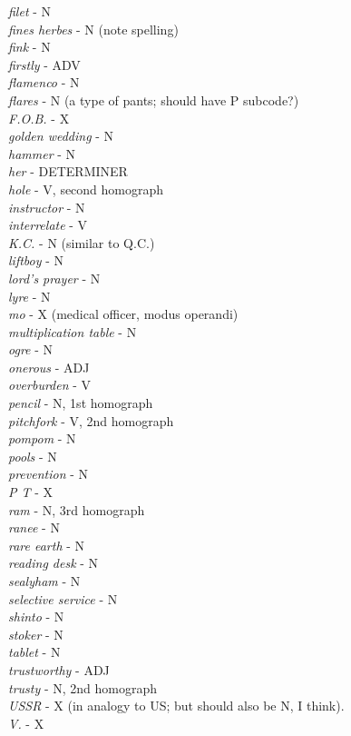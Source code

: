 {\it filet}        -  N \\
{\it fines herbes} -  N  (note spelling) \\
{\it fink}         -  N \\
{\it firstly}      -  ADV \\
{\it flamenco}     -  N \\
{\it flares}       -  N (a type of pants; should have P subcode?) \\
{\it F.O.B.}       -  X \\
{\it golden wedding} - N \\
{\it hammer}       -  N   \\			
{\it her}          - DETERMINER \\
{\it hole}         - V, second homograph \\
{\it instructor}   - N \\
{\it interrelate}  - V \\
{\it K.C.}         -  N (similar to Q.C.) \\
{\it liftboy}      - N \\
{\it lord's prayer} - N \\
{\it lyre}         - N \\
{\it mo}           - X (medical officer, modus operandi) \\
{\it multiplication table} - N \\
{\it ogre}         - N \\
{\it onerous}      - ADJ \\
{\it overburden}   - V \\
{\it pencil}       - N, 1st homograph \\
{\it pitchfork}    - V, 2nd homograph \\
{\it pompom}       - N \\
{\it pools}        - N \\
{\it prevention}   - N \\
{\it P T}          - X \\
{\it ram}          - N, 3rd homograph \\
{\it ranee}        - N \\
{\it rare earth}   - N \\
{\it reading desk} - N \\
{\it sealyham}     - N \\
{\it selective service} - N \\
{\it shinto}       - N \\
{\it stoker}       - N \\
{\it tablet}       - N \\
{\it trustworthy}  - ADJ \\
{\it trusty}       - N, 2nd homograph \\
{\it USSR}         - X (in analogy to US; but should also be N, I think). \\
{\it V.}           -  X \\

